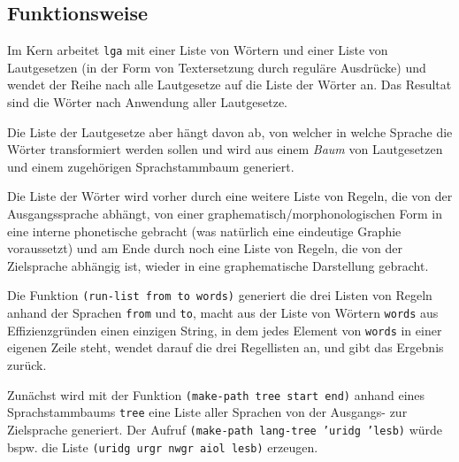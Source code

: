 \documentclass[12pt,a4paper,normalheadings]{scrartcl}
\def\tt#1{\texttt{#1}}
\begin{document}
\subsection{Funktionsweise}

Im Kern arbeitet \tt{lga} mit einer Liste von Wörtern
und einer Liste von Lautgesetzen
(in der Form von Textersetzung durch reguläre Ausdrücke)
und wendet der Reihe nach alle Lautgesetze auf die Liste der Wörter an.
Das Resultat sind die Wörter nach Anwendung aller Lautgesetze.

Die Liste der Lautgesetze aber hängt davon ab,
von welcher in welche Sprache die Wörter transformiert werden sollen
und wird aus einem \emph{Baum} von Lautgesetzen und einem
zugehörigen Sprachstammbaum generiert.

Die Liste der Wörter wird vorher durch eine weitere Liste von Regeln,
die von der Ausgangssprache abhängt,
von einer graphematisch/morphonologischen
Form in eine interne phonetische gebracht
(was natürlich eine eindeutige Graphie voraussetzt)
und am Ende durch noch eine Liste von Regeln,
die von der Zielsprache abhängig ist,
wieder in eine graphematische Darstellung gebracht.

Die Funktion \tt{(run-list from to words)}
generiert die drei Listen von Regeln anhand der Sprachen \tt{from} und \tt{to},
macht aus der Liste von Wörtern \tt{words} aus Effizienzgründen einen
einzigen String,
in dem jedes Element von \tt{words} in einer eigenen Zeile steht,
wendet darauf die drei Regellisten an,
und gibt das Ergebnis zurück.

Zunächst wird mit der Funktion \tt{(make-path tree start end)} anhand
eines Sprachstammbaums \tt{tree}
eine Liste aller Sprachen von der Ausgangs- zur Zielsprache generiert.
Der Aufruf \tt{(make-path lang-tree 'uridg 'lesb)} würde bspw.
die Liste \tt{(uridg urgr nwgr aiol lesb)} erzeugen.
\end{document}
